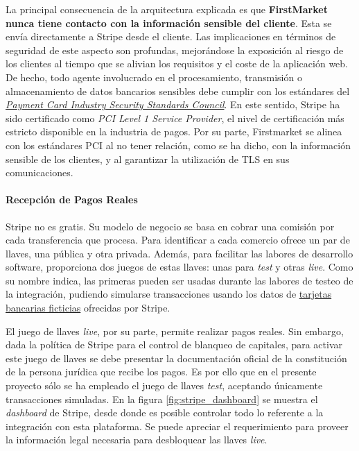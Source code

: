 \documentclass[a4paper]{article}
\begin{document}
    La principal consecuencia de la arquitectura explicada es que \textbf{FirstMarket nunca tiene contacto con la información sensible del cliente}. Esta se envía directamente a Stripe desde el cliente. Las implicaciones en términos de seguridad de este aspecto son profundas, mejorándose la exposición al riesgo de los clientes al tiempo que se alivian los requisitos y el coste de la aplicación web. De hecho, todo agente involucrado en el procesamiento, transmisión o almacenamiento de datos bancarios sensibles debe cumplir con los estándares del \href{https://www.pcisecuritystandards.org/pci_security/}{\emph{Payment Card Industry Security Standards Council}}. En este sentido, Stripe ha sido certificado como \emph{PCI Level 1 Service Provider}, el nivel de certificación más estricto disponible en la industria de pagos. Por su parte, Firstmarket se alinea con los estándares PCI al no tener relación, como se ha dicho, con la información sensible de los clientes, y al garantizar la utilización de TLS en sus comunicaciones.
    
    \paragraph{Recepción de Pagos Reales}
    Stripe no es gratis. Su modelo de negocio se basa en cobrar una comisión por cada transferencia que procesa. Para identificar a cada comercio ofrece un par de llaves, una pública y otra privada. Además, para facilitar las labores de desarrollo software, proporciona dos juegos de estas llaves: unas para \emph{test} y otras \emph{live}. Como su nombre indica, las primeras pueden ser usadas durante las labores de testeo de la integración, pudiendo simularse transacciones usando los datos de \href{https://stripe.com/docs/payments/accept-a-payment#web-test-integration}{tarjetas bancarias ficticias} ofrecidas por Stripe.
    
    El juego de llaves \emph{live}, por su parte, permite realizar pagos reales. Sin embargo, dada la política de Stripe para el control de blanqueo de capitales, para activar este juego de llaves se debe presentar la documentación oficial de la constitución de la persona jurídica que recibe los pagos. Es por ello que en el presente proyecto sólo se ha empleado el juego de llaves \emph{test}, aceptando únicamente transacciones simuladas. En la figura \ref{fig:stripe_dashboard} se muestra el \emph{dashboard} de Stripe, desde donde es posible controlar todo lo referente a la integración con esta plataforma. Se puede apreciar el requerimiento para proveer la información legal necesaria para desbloquear las llaves \emph{live}.
    
\end{document}
